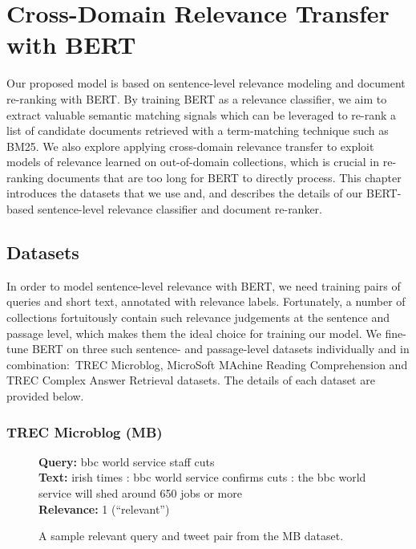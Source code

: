 \chapter{Cross-Domain Relevance Transfer with BERT}
\label{ch:model}


Our proposed model is based on sentence-level relevance modeling and document re-ranking with BERT.
By training BERT as a relevance classifier, we aim to extract valuable semantic matching signals which can be leveraged to re-rank a list of candidate documents retrieved with a term-matching technique such as BM25.
We also explore applying cross-domain relevance transfer to exploit models of relevance learned on out-of-domain collections, which is crucial in re-ranking documents that are too long for BERT to directly process.
This chapter introduces the datasets that we use and, and describes the details of our BERT-based sentence-level relevance classifier and document re-ranker.

\section{Datasets}

In order to model sentence-level relevance with BERT, we need training pairs of queries and short text, annotated with relevance labels.
Fortunately, a number of collections fortuitously contain such relevance judgements at the sentence and passage level, which makes them the ideal choice for training our model.
We fine-tune BERT on three such sentence- and passage-level datasets individually and in combination:\ TREC Microblog, MicroSoft MAchine Reading Comprehension and TREC Complex Answer Retrieval datasets.
The details of each dataset are provided below.

\subsection{TREC Microblog (MB)}

\begin{figure}[b!]
	\begin{framed}
		\centering
    		\textbf{Query:} bbc world service staff cuts \\
    		\textbf{Text:} irish times : bbc world service confirms cuts : the bbc world service will shed around 650 jobs or more \\
    		\textbf{Relevance:} 1 (``relevant'')
	\end{framed}
\label{mb-example}
 \caption{A sample relevant query and tweet pair from the MB dataset.}
\end{figure}


